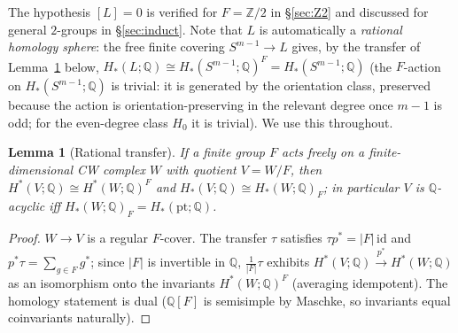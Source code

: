 \documentclass[12pt]{article}
\newtheorem{lemma}[theorem]{Lemma}
\theoremstyle{definition}
\begin{document}
The hypothesis $[L]=0$ is verified for $F=\mathbb{Z}/2$ in
\S\ref{sec:Z2} and discussed for general $2$-groups in \S\ref{sec:induct}.
Note that $L$ is automatically a \emph{rational homology sphere}: the free
finite covering $S^{m-1}\to L$ gives, by the transfer of
Lemma~\ref{lem:transfer} below, $H_*(L;\mathbb{Q})\cong
H_*(S^{m-1};\mathbb{Q})^F=H_*(S^{m-1};\mathbb{Q})$ (the $F$-action on
$H_*(S^{m-1};\mathbb{Q})$ is trivial: it is generated by the orientation class,
preserved because the action is orientation-preserving in the relevant
degree once $m-1$ is odd; for the even-degree class $H_0$ it is trivial). We use
this throughout.

\begin{lemma}[Rational transfer]\label{lem:transfer}
If a finite group $F$ acts freely on a finite-dimensional CW complex $W$ with
quotient $V=W/F$, then
$H^*(V;\mathbb{Q})\cong H^*(W;\mathbb{Q})^F$ and
$H_*(V;\mathbb{Q})\cong H_*(W;\mathbb{Q})_F$; in particular $V$ is
$\mathbb{Q}$-acyclic iff $H_*(W;\mathbb{Q})_F=H_*(\mathrm{pt};\mathbb{Q})$.
\end{lemma}
\begin{proof}
$W\to V$ is a regular $F$-cover. The transfer $\tau$ satisfies
$\tau p^*=|F|\,\mathrm{id}$ and $p^*\tau=\sum_{g\in F}g^*$; since $|F|$ is
invertible in $\mathbb{Q}$, $\tfrac1{|F|}\tau$ exhibits
$H^*(V;\mathbb{Q})\xrightarrow{p^*}H^*(W;\mathbb{Q})$ as an isomorphism onto the
invariants $H^*(W;\mathbb{Q})^F$ (averaging idempotent). The homology
statement is dual ($\mathbb{Q}[F]$ is semisimple by Maschke, so invariants
equal coinvariants naturally).
\end{proof}
\end{document}
